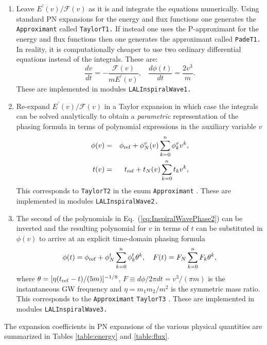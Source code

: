 \begin{enumerate}
\item Leave  $E^{\prime}(v)/\mathcal{F}(v)$ as it is and integrate the
equations numerically. Using standard PN expansions for the
energy and flux functions one generates the {\tt Approximant} called \texttt{TaylorT1.}
If instead one uses the P-approximant for the energy and flux functions
\cite{dis3,dis1} then one generates the approximant called \texttt{PadeT1.}
In reality, it is computationally cheaper to use two ordinary differential
equations instead of the integrals. These are:
\begin{equation}
\frac{dv}{dt} = - \frac{\mathcal{F}(v)}{m E^{\prime}(v)},\ \ \ \
\frac{d \phi(t)}{dt} = \frac{2v^{3}}{m}.
\label{eq:ode2}
\end{equation}
These are implemented in modules {\tt LALInspiralWave1.}

\item Re-expand $E^{\prime}(v)/\mathcal{F}(v)$ in a Taylor expansion
in which case the integrals can be solved analytically to obtain a
{\it parametric} representation of the phasing formula in terms of
polynomial expressions in the auxiliary variable $v$
\begin {eqnarray}
\phi(v)&=& \phi_{\rm ref} +
\phi^v_N (v)\sum_{k=0}^{n} {\phi}^v_k v^k, \nonumber\\
t(v)&=& t_{\rm ref} +t_N(v) \sum_{k=0}^{n} {t}_k v^k,
\label{eq:InspiralWavePhase2}
\end {eqnarray}
This corresponds to \texttt{TaylorT2} in the enum \texttt{Approximant} \cite{dis3}.
These are implemented in modules {\tt LALInspiralWave2.}

\item The second of the polynomials in Eq.~(\ref{eq:InspiralWavePhase2}) can
be inverted and the resulting polynomial for $v$ in terms of
$t$ can be substituted in $\phi(v)$ to arrive at an explicit  time-domain
phasing formula
\begin{equation}
\phi(t)=\phi_{\rm ref}+\phi_N^t \sum_{k=0}^{n}
{\phi}^t_k\theta^k, \ \ \
F(t)= F_N \sum_{k=0}^{n} {F}_k \theta^k,
\label{eq:InspiralWavePhase3}
\end{equation}
where $\theta=[\eta (t_{\rm ref}-t)/(5m)]^{-1/8}$,
$F \equiv d \phi/ 2 \pi dt =v^3/(\pi m)$ is the instantaneous GW frequency
and $\eta=m_1 m_2/m^2$ is the symmetric mass ratio.
This corresponds to the {\tt Approximant} \texttt{TaylorT3}  \cite{BDIWW,BIWW,dis3}.
These are implemented in modules {\tt LALInspiralWave3.}
\end{enumerate}
The expansion coefficients in PN expansions of the various physical
quantities are summarized in Tables \ref{table:energy} and \ref{table:flux}.

